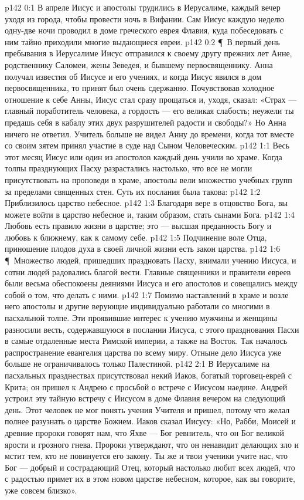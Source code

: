 \vs p142 0:1 В апреле Иисус и апостолы трудились в Иерусалиме, каждый вечер уходя из города, чтобы провести ночь в Вифании. Сам Иисус каждую неделю одну\hyp{}две ночи проводил в доме греческого еврея Флавия, куда побеседовать с ним тайно приходили многие выдающиеся евреи.
\vs p142 0:2 \P\ В первый день пребывания в Иерусалиме Иисус отправился к своему другу прежних лет Анне, родственнику Саломеи, жены Зеведея, и бывшему первосвященнику. Анна получал известия об Иисусе и его учениях, и когда Иисус явился в дом первосвященника, то принят был очень сдержанно. Почувствовав холодное отношение к себе Анны, Иисус стал сразу прощаться и, уходя, сказал: «Страх --- главный поработитель человека, а гордость --- его великая слабость; неужели ты предашь себя в кабалу этих двух разрушителей радости и свободы?» Но Анна ничего не ответил. Учитель больше не видел Анну до времени, когда тот вместе со своим зятем принял участие в суде над Сыном Человеческим.
\vs p142 1:1 Весь этот месяц Иисус или один из апостолов каждый день учили во храме. Когда толпы празднующих Пасху разрастались настолько, что все не могли присутствовать на проповеди в храме, апостолы вели множество учебных групп за пределами священных стен. Суть их послания была такова:
\vs p142 1:2 \bibnobreakspace Приблизилось царство небесное.
\vs p142 1:3 \bibnobreakspace Благодаря вере в отцовство Бога, вы можете войти в царство небесное и, таким образом, стать сынами Бога.
\vs p142 1:4 \bibnobreakspace Любовь есть правило жизни в царстве; это --- высшая преданность Богу и любовь к ближнему, как к самому себе.
\vs p142 1:5 \bibnobreakspace Подчинение воле Отца, приношение плодов духа в своей личной жизни есть закон царства.
\vs p142 1:6 \P\ Множество людей, пришедших праздновать Пасху, внимали учению Иисуса, и сотни людей радовались благой вести. Главные священники и правители евреев были весьма обеспокоены деяниями Иисуса и его апостолов и совещались между собой о том, что делать с ними.
\vs p142 1:7 Помимо наставлений в храме и возле него апостолы и другие верующие индивидуально работали со многими в пасхальной толпе. Эти проявившие интерес к учению мужчины и женщины разносили весть, содержавшуюся в послании Иисуса, с этого празднования Пасхи в самые отдаленные места Римской империи, а также на Восток. Так началось распространение евангелия царства по всему миру. Отныне дело Иисуса уже больше не ограничивалось только Палестиной.
\vs p142 2:1 В Иерусалиме на пасхальных празднествах присутствовал некий Иаков, богатый торговец\hyp{}еврей с Крита; он пришел к Андрею с просьбой о встрече с Иисусом наедине. Андрей устроил эту тайную встречу с Иисусом в доме Флавия вечером на следующий день. Этот человек не мог понять учения Учителя и пришел, потому что желал полнее разузнать о царстве Божием. Иаков сказал Иисусу: «Но, Рабби, Моисей и древние пророки говорят нам, что Яхве --- Бог ревнитель, что он Бог великой ярости и грозного гнева. Пророки утверждают, что он ненавидит делающих зло и мстит тем, кто не повинуется его закону. Ты же и твои ученики учите нас, что Бог --- добрый и сострадающий Отец, который настолько любит всех людей, что с радостью примет их в этом новом царстве небесном, которое, как вы говорите, уже совсем близко».
